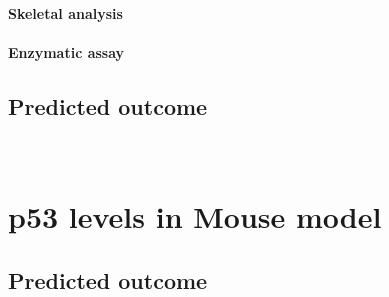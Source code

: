 \documentclass[12pt]{article}
\begin{document}
\paragraph{Skeletal analysis}
\paragraph{Enzymatic assay}

\subsection{Predicted outcome}\

\section{p53 levels in Mouse model}

\subsection{Predicted outcome}
\end{document}
